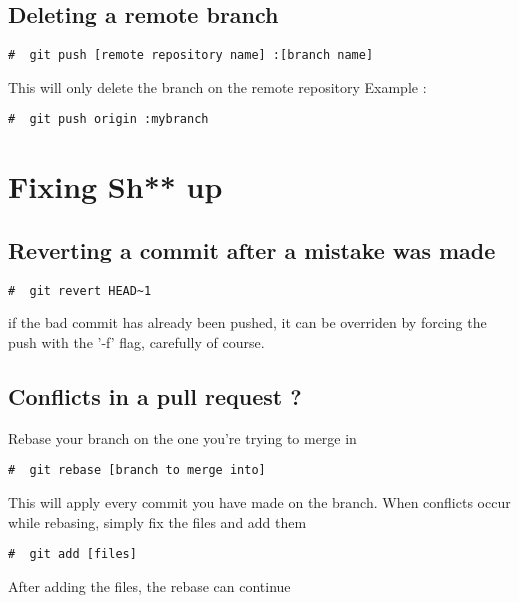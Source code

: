 \documentclass{article}
\begin{document}
\subsection{Deleting a remote branch}
\begin{lstlisting}[style=BashInputStyle]
    #  git push [remote repository name] :[branch name]
\end{lstlisting}
This will only delete the branch on the remote repository
Example :
\begin{lstlisting}[style=BashInputStyle]
    #  git push origin :mybranch
\end{lstlisting}


\section{Fixing Sh** up}

\subsection{Reverting a commit after a mistake was made}

\begin{lstlisting}[style=BashInputStyle]
    #  git revert HEAD~1
\end{lstlisting}

if the bad commit has already been pushed, it can be overriden by forcing the push with the '-f' flag, carefully of course.

\subsection{Conflicts in a pull request ?}

Rebase your branch on the one you're trying to merge in

\begin{lstlisting}[style=BashInputStyle]
    #  git rebase [branch to merge into]
\end{lstlisting}

This will apply every commit you have made on the branch. When conflicts occur while rebasing, simply fix the files and add them

\begin{lstlisting}[style=BashInputStyle]
    #  git add [files]
\end{lstlisting}

After adding the files, the rebase can continue
\end{document}

